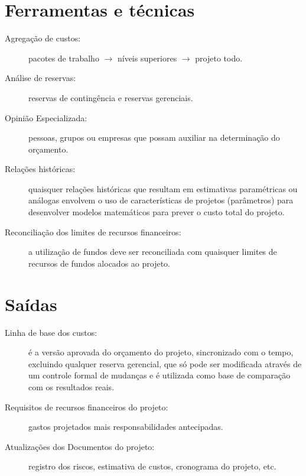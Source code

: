 \section{Ferramentas e técnicas}

\begin{description}

	\item[Agregação de custos:] pacotes de trabalho $\rightarrow$ níveis superiores $\rightarrow$ projeto todo.
	
	\item[Análise de reservas:] reservas de contingência e reservas gerenciais.
	
	\item[Opinião Especializada:] pessoas, grupos ou empresas que possam auxiliar na determinação do orçamento.
	
	\item[Relações históricas:] quaisquer relações históricas que resultam em estimativas paramétricas ou análogas envolvem o uso de características de projetos (parâmetros) para desenvolver modelos matemáticos para prever o custo total do projeto.
	
	\item[Reconciliação dos limites de recursos financeiros:] a utilização de fundos deve ser reconciliada com quaisquer limites de recursos de fundos alocados ao projeto.
		
\end{description}

\section{Saídas}

\begin{description}
	
	\item[Linha de base dos custos:] é a versão aprovada do orçamento do projeto, sincronizado com o tempo, excluindo qualquer reserva gerencial, que só pode ser modificada através de um controle formal de mudanças e é utilizada como base de comparação com os resultados reais.
	
	\item[Requisitos de recursos financeiros do projeto:] gastos projetados mais responsabilidades antecipadas.
	
	\item[Atualizações dos Documentos do projeto:] registro dos riscos, estimativa de custos, cronograma do projeto, etc.

	
\end{description}

